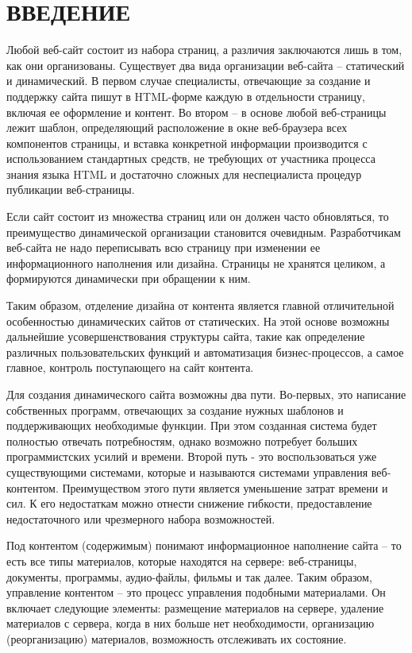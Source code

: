 \section*{ВВЕДЕНИЕ}

Любой веб-сайт состоит из набора страниц, а различия заключаются лишь в том, как они организованы. Существует два вида организации веб-сайта -- статический и динамический. В первом случае специалисты, отвечающие за создание и поддержку сайта пишут в HTML-форме каждую в отдельности страницу, включая ее оформление и контент. Во втором -- в основе любой веб-страницы лежит шаблон, определяющий расположение в окне веб-браузера всех компонентов страницы, и вставка конкретной информации производится с использованием стандартных средств, не требующих от участника процесса знания языка HTML и достаточно сложных для неспециалиста процедур публикации веб-страницы.

Если сайт состоит из множества страниц или он должен часто обновляться, то преимущество динамической организации становится очевидным. Разработчикам веб-сайта не надо переписывать всю страницу при изменении ее информационного наполнения или дизайна. Страницы не хранятся целиком, а формируются динамически при обращении к ним.

Таким образом, отделение дизайна от контента является главной отличительной особенностью динамических сайтов от статических. На этой основе возможны дальнейшие усовершенствования структуры сайта, такие как определение различных пользовательских функций и автоматизация бизнес-процессов, а самое главное, контроль поступающего на сайт контента.

Для создания динамического сайта возможны два пути. Во-первых, это написание собственных программ, отвечающих за создание нужных шаблонов и поддерживающих необходимые функции. При этом созданная система будет полностью отвечать потребностям, однако возможно потребует больших программистских усилий и времени. Второй путь - это воспользоваться уже существующими системами, которые и называются системами управления веб-контентом. Преимуществом этого пути является уменьшение затрат времени и сил. К его недостаткам можно отнести снижение гибкости, предоставление недостаточного или чрезмерного набора возможностей.

Под контентом (содержимым) понимают информационное наполнение сайта -- то есть все типы материалов, которые находятся на сервере: веб-страницы, документы, программы, аудио-файлы, фильмы и так далее. Таким образом, управление контентом -- это процесс управления подобными материалами. Он включает следующие элементы: размещение материалов на сервере, удаление материалов с сервера, когда в них больше нет необходимости, организацию (реорганизацию) материалов, возможность отслеживать их состояние.

